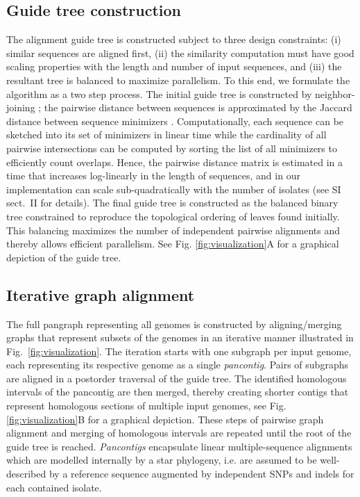 \documentclass[aps,rmp,preprint,superscriptaddress,10pt,linenumbers]{revtex4-1}
\newcommand{\SIalgo}{II}
\begin{document}
\subsection{Guide tree construction}
The alignment guide tree is constructed subject to three design constraints: (i) similar sequences are aligned first, (ii) the similarity computation must have good scaling properties with the length and number of input sequences, and (iii) the resultant tree is balanced to maximize parallelism.
To this end, we formulate the algorithm as a two step process.
The initial guide tree is constructed by neighbor-joining \cite{saitou1987neighbor}; the pairwise distance between sequences is approximated by the Jaccard distance between sequence minimizers \cite{roberts2004reducing}.
Computationally, each sequence can be sketched into its set of minimizers in linear time while the cardinality of all pairwise intersections can be computed by sorting the list of all minimizers to efficiently count overlaps.
Hence, the pairwise distance matrix is estimated in a time that increases log-linearly in the length of sequences, and in our implementation can scale sub-quadratically with the number of isolates (see SI sect.~\SIalgo{} for details).
The final guide tree is constructed as the balanced binary tree constrained to reproduce the topological ordering of leaves found initially.
This balancing maximizes the number of independent pairwise alignments and thereby allows efficient parallelism.
See Fig. \ref{fig:visualization}A for a graphical depiction of the guide tree.

\subsection{Iterative graph alignment}
The full pangraph representing all genomes is constructed by aligning/merging graphs that represent subsets of the genomes in an iterative manner illustrated in Fig.~\ref{fig:visualization}.
The iteration starts with one subgraph per input genome, each representing its respective genome as a single \emph{pancontig}.
Pairs of subgraphs are aligned in a postorder traversal of the guide tree.
The identified homologous intervals of the pancontig are then merged, thereby creating shorter contigs that represent homologous sections of multiple input genomes, see Fig. \ref{fig:visualization}B for a graphical depiction.
These steps of pairwise graph alignment and merging of homologous intervals are repeated until the root of the guide tree is reached.
\emph{Pancontigs} encapsulate linear multiple-sequence alignments which are modelled internally by a star phylogeny, i.e. are assumed to be well-described by a reference sequence augmented by independent SNPs and indels for each contained isolate.
\end{document}

